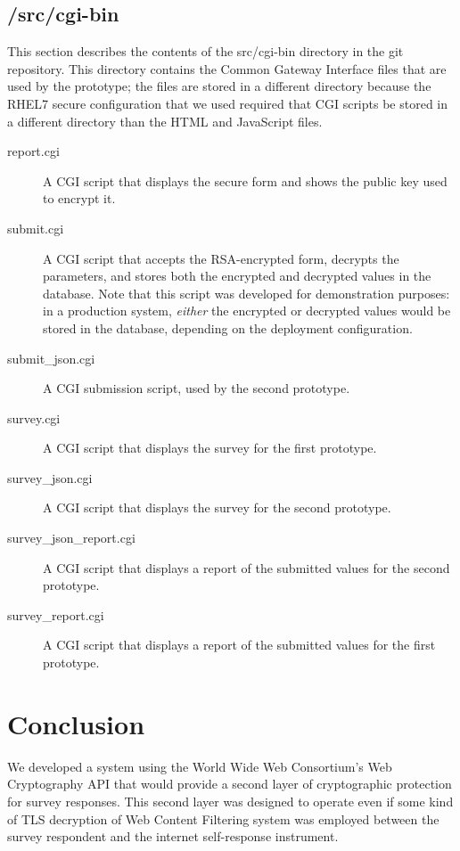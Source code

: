 \documentclass[fleqn,10pt]{wlscirep}
\begin{document}
\subsection{/src/cgi-bin}
This section describes the contents of the src/cgi-bin directory in
the git repository. This directory contains the Common Gateway
Interface files that are used by the prototype; the files are stored
in a different directory because the RHEL7 secure configuration that
we used required that CGI scripts be stored in a different directory
than the HTML and JavaScript files.

\begin{description}

  \item[report.cgi] A CGI script that displays the secure form and
    shows the public key used to encrypt it.
    \item[submit.cgi] A CGI script that accepts the RSA-encrypted
      form, decrypts the parameters, and stores both the encrypted and
      decrypted values in the database. Note that this script was
      developed for demonstration purposes: in a production system,
      \emph{either} the encrypted or decrypted values would be stored
      in the database, depending on the deployment configuration.
      \item[submit\_json.cgi] A CGI submission script, used by the
        second prototype.
      \item[survey.cgi] A CGI script that displays the survey for the
        first prototype.
      \item[survey\_json.cgi] A CGI script that displays the survey
        for the second prototype.
      \item[survey\_json\_report.cgi] A CGI script that displays a
        report of the submitted values for the second prototype. 
      \item[survey\_report.cgi] A  CGI script that displays a
        report of the submitted values for the first prototype.
\end{description}        


%


\section{Conclusion}
We developed a system using the World Wide Web Consortium's Web
Cryptography API that would provide a second layer of cryptographic
protection for survey responses. This second layer was designed to
operate even if some kind of TLS decryption of Web Content Filtering
system was employed between the survey respondent and the internet
self-response instrument.
\end{document}

